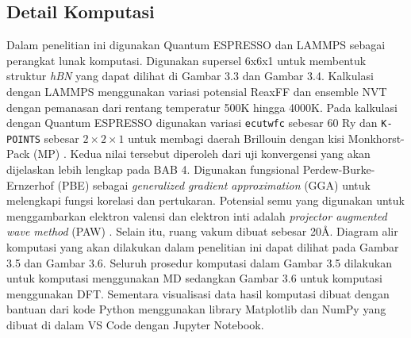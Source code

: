 \subsection{Detail Komputasi}
Dalam penelitian ini digunakan Quantum ESPRESSO \citep{giannozzi_quantum_2009} dan LAMMPS \citep{plimpton_fast_1995} sebagai perangkat lunak komputasi. Digunakan supersel 6x6x1 untuk membentuk struktur \textit{hBN} yang dapat dilihat di Gambar 3.3 dan Gambar 3.4. Kalkulasi dengan LAMMPS menggunakan variasi potensial ReaxFF \citep{doi:10.1021/acs.jpca.1c09648} dan ensemble NVT dengan pemanasan dari rentang temperatur 500K hingga 4000K. Pada kalkulasi dengan Quantum ESPRESSO digunakan variasi \texttt{ecutwfc} sebesar 60 Ry dan \texttt{K-POINTS} sebesar $2\times2\times1$ untuk membagi daerah Brillouin dengan kisi Monkhorst-Pack (MP) \citep{monkhorst1976}. Kedua nilai tersebut diperoleh dari uji konvergensi yang akan dijelaskan lebih lengkap pada BAB 4. Digunakan fungsional Perdew-Burke-Ernzerhof (PBE) \citep{Perdew1996} sebagai \textit{generalized gradient approximation} (GGA) untuk melengkapi fungsi korelasi dan pertukaran. Potensial semu yang digunakan untuk menggambarkan elektron valensi dan elektron inti adalah \textit{projector augmented wave method} (PAW) \citep{blochl_projector_1994}. Selain itu, ruang vakum dibuat sebesar 20\AA.
Diagram alir komputasi yang akan dilakukan dalam penelitian ini dapat dilihat pada Gambar 3.5 dan Gambar 3.6. Seluruh prosedur komputasi dalam Gambar 3.5 dilakukan untuk komputasi menggunakan MD sedangkan Gambar 3.6 untuk komputasi menggunakan DFT. Sementara visualisasi data hasil komputasi dibuat dengan bantuan dari kode Python menggunakan library Matplotlib dan NumPy yang dibuat di dalam VS Code dengan Jupyter Notebook.

